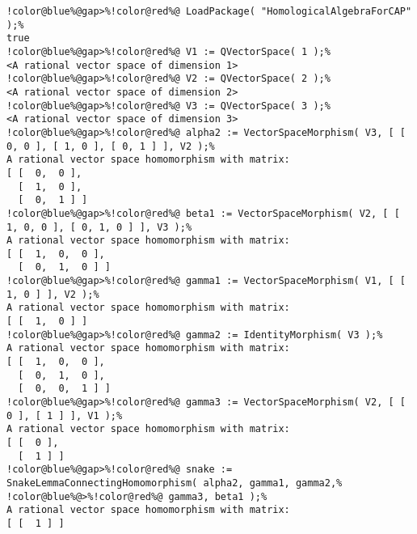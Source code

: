 \begin{Verbatim}[commandchars=!@\%,frame=single]
!color@blue%@gap>%!color@red%@ LoadPackage( "HomologicalAlgebraForCAP" );%
true
!color@blue%@gap>%!color@red%@ V1 := QVectorSpace( 1 );%
<A rational vector space of dimension 1>
!color@blue%@gap>%!color@red%@ V2 := QVectorSpace( 2 );%
<A rational vector space of dimension 2>
!color@blue%@gap>%!color@red%@ V3 := QVectorSpace( 3 );%
<A rational vector space of dimension 3>
!color@blue%@gap>%!color@red%@ alpha2 := VectorSpaceMorphism( V3, [ [ 0, 0 ], [ 1, 0 ], [ 0, 1 ] ], V2 );%
A rational vector space homomorphism with matrix: 
[ [  0,  0 ],
  [  1,  0 ],
  [  0,  1 ] ]
!color@blue%@gap>%!color@red%@ beta1 := VectorSpaceMorphism( V2, [ [ 1, 0, 0 ], [ 0, 1, 0 ] ], V3 );%
A rational vector space homomorphism with matrix: 
[ [  1,  0,  0 ],
  [  0,  1,  0 ] ]
!color@blue%@gap>%!color@red%@ gamma1 := VectorSpaceMorphism( V1, [ [ 1, 0 ] ], V2 );%
A rational vector space homomorphism with matrix: 
[ [  1,  0 ] ]
!color@blue%@gap>%!color@red%@ gamma2 := IdentityMorphism( V3 );%
A rational vector space homomorphism with matrix: 
[ [  1,  0,  0 ],
  [  0,  1,  0 ],
  [  0,  0,  1 ] ]
!color@blue%@gap>%!color@red%@ gamma3 := VectorSpaceMorphism( V2, [ [ 0 ], [ 1 ] ], V1 );%
A rational vector space homomorphism with matrix: 
[ [  0 ],
  [  1 ] ]
!color@blue%@gap>%!color@red%@ snake := SnakeLemmaConnectingHomomorphism( alpha2, gamma1, gamma2,%
!color@blue%@>%!color@red%@ gamma3, beta1 );%
A rational vector space homomorphism with matrix: 
[ [  1 ] ]
\end{Verbatim}
